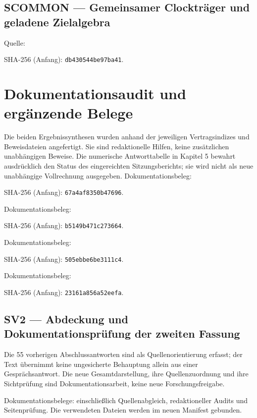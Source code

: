 \documentclass[11pt,a4paper,oneside,parskip=half,headings=normal,numbers=noenddot,bibliography=totoc]{scrreprt}
\begin{document}
\subsection*{SCOMMON — Gemeinsamer Clockträger und geladene Zielalgebra}\label{s:COMMON}
Quelle: \par{\footnotesize SHA-256 (Anfang): \texttt{db430544be97ba41}.}\par
\section{Dokumentationsaudit und ergänzende Belege}
Die beiden Ergebnissynthesen wurden anhand der jeweiligen Vertragsindizes und Beweisdateien angefertigt. Sie sind redaktionelle Hilfen, keine zusätzlichen unabhängigen Beweise. Die numerische Antworttabelle in Kapitel 5 bewahrt ausdrücklich den Status des eingereichten Sitzungsberichts; sie wird nicht als neue unabhängige Vollrechnung ausgegeben.
Dokumentationsbeleg: \par{\footnotesize SHA-256 (Anfang): \texttt{67a4af8350b47696}.}\par
Dokumentationsbeleg: \par{\footnotesize SHA-256 (Anfang): \texttt{b5149b471c273664}.}\par
Dokumentationsbeleg: \par{\footnotesize SHA-256 (Anfang): \texttt{505ebbe6be3111c4}.}\par
Dokumentationsbeleg: \par{\footnotesize SHA-256 (Anfang): \texttt{23161a856a52eefa}.}\par

\subsection*{SV2 — Abdeckung und Dokumentationsprüfung der zweiten Fassung}\label{s:V2}
Die 55 vorherigen Abschlussantworten sind als Quellenorientierung erfasst; der Text übernimmt keine ungesicherte Behauptung allein aus einer Gesprächsantwort. Die neue Gesamtdarstellung, ihre Quellenzuordnung und ihre Sichtprüfung sind Dokumentationsarbeit, keine neue Forschungsfreigabe.\par
Dokumentationsbelege:  einschließlich Quellenabgleich, redaktioneller Audits und Seitenprüfung. Die verwendeten Dateien werden im neuen Manifest gebunden.\par
\end{document}
